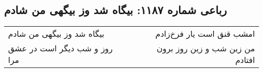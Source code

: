 \begin{center}
\section*{رباعی شماره ۱۱۸۷: بیگاه شد وز بیگهی من شادم}
\label{sec:1187}
\begin{longtable}{l p{0.5cm} r}
بیگاه شد وز بیگهی من شادم
&&
امشب قنق است یار فرخ‌زادم
\\
روز و شب دیگر است در عشق مرا
&&
من زین شب و زین روز برون افتادم
\\
\end{longtable}
\end{center}
